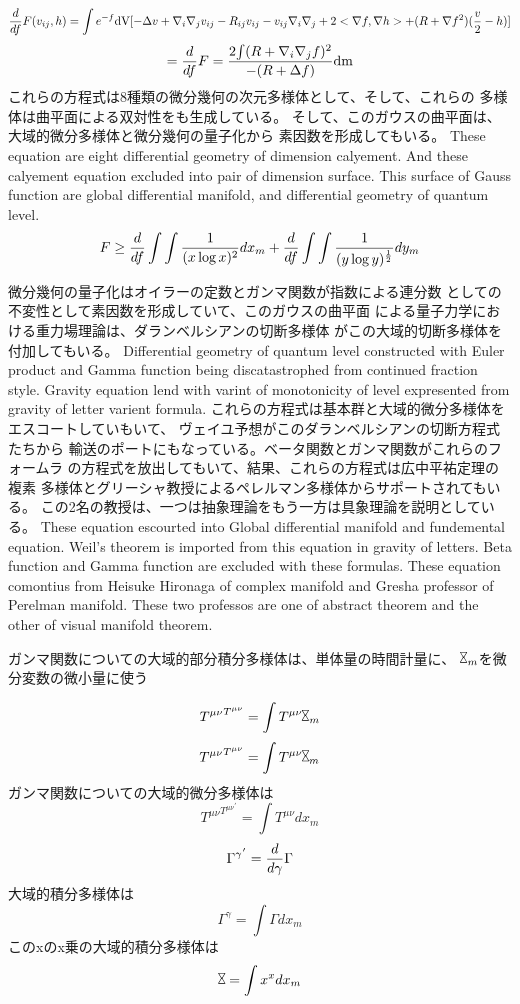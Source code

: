 \documentclass{jsarticle}
\begin{document}
  $$ {d \over d f}F(v_{ij},h) = \int {e^{-f}\mathrm{dV}}
  [- \Delta v + \nabla_{i}\nabla_{j}
  v_{ij} - R_{ij}v_{ij} - v_{ij}\nabla_{i}\nabla_{j} + 2 <\nabla f,\nabla h>
  + (R + \nabla f^2)({v \over 2} - h)]$$
  $$ = {d \over d f}F = {2 {\int (R + \nabla_{i}\nabla_{j} f)^2} \over 
  { - (R + \Delta f)}}\mathrm{dm} $$
  これらの方程式は8種類の微分幾何の次元多様体として、そして、これらの
  多様体は曲平面による双対性をも生成している。 
  そして、このガウスの曲平面は、大域的微分多様体と微分幾何の量子化から
  素因数を形成してもいる。
  These equation are eight differential geometry of dimension calyement.
  And these calyement equation excluded into pair of dimension surface.
  This surface of Gauss function are global differential manifold,
  and differential geometry of quantum level.
  $$ F \ge {d \over d f}\int \int{1 \over (x \log x)^2}dx_m 
  + {d \over d f}\int \int{1 \over (y \log y)^{1 \over 2}}dy_m $$

  微分幾何の量子化はオイラーの定数とガンマ関数が指数による連分数
  としての不変性として素因数を形成していて、このガウスの曲平面
  による量子力学における重力場理論は、ダランベルシアンの切断多様体
  がこの大域的切断多様体を付加してもいる。
  Differential geometry of quantum level constructed with Euler product
  and Gamma function being discatastrophed from continued fraction style.
  Gravity equation lend with varint of monotonicity of level expresented
  from gravity of letter varient formula.
  これらの方程式は基本群と大域的微分多様体をエスコートしていもいて、
  ヴェイユ予想がこのダランベルシアンの切断方程式たちから
  輸送のポートにもなっている。ベータ関数とガンマ関数がこれらのフォームラ
  の方程式を放出してもいて、結果、これらの方程式は広中平祐定理の複素
  多様体とグリーシャ教授によるペレルマン多様体からサポートされてもいる。
  この2名の教授は、一つは抽象理論をもう一方は具象理論を説明としている。
  These equation escourted into Global differential manifold and
  fundemental equation.
  Weil's theorem is imported from this equation in gravity of letters.
  Beta function and Gamma function are excluded with these formulas.
  These equation comontius from Heisuke Hironaga of complex manifold
  and Gresha professor of Perelman manifold.
  These two professos are one of abstract theorem and the other of
  visual manifold theorem.


ガンマ関数についての大域的部分積分多様体は、単体量の時間計量に、
$ \timebow_m $を微分変数の微小量に使う

$$ {T^{\mu\nu}}^{T^{\mu\nu}} = \int T^{\mu\nu} \timebow_m $$
   $$ {T^{\mu\nu}}^{T^{\mu\nu}} = \int T^{\mu\nu} \rotatebox{90}{$\bowtie$}_m $$
   ガンマ関数についての大域的微分多様体は
   $$   {T^{\mu\nu}}^{{T^{\mu\nu}}^{'}}=\int T^{\mu\nu}dx_m  $$
      $$ {\Gamma^{\gamma}}^{'} = {d \over {d \gamma}}\Gamma $$
      大域的積分多様体は
   $$ \Gamma^{\gamma} = \int \Gamma dx_m $$
   このxのx乗の大域的積分多様体は　
   $$ \rotatebox{90}{$\bowtie$} = \int x^x dx_m $$
\end{document}
